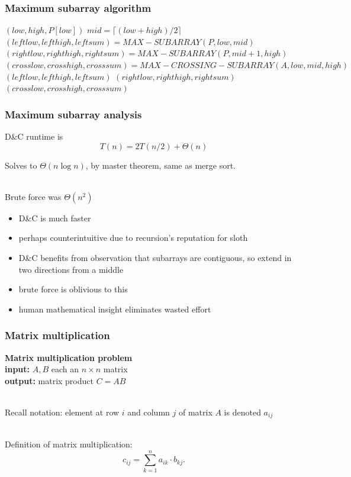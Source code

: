 \documentclass{beamer}
\newcommand{\stanza}{ \\~\ }
\begin{document}
\begin{frame} \frametitle{Maximum subarray algorithm}
  {\tiny
  \begin{algorithmic}[1]
      \State \Return $(low, high, P[low])$
    \Else
      \State $mid = \lceil (low+high)/2 \rceil$
      \State $(leftlow, lefthigh, leftsum) = MAX-SUBARRAY(P, low, mid)$
      \State $(rightlow, righthigh, rightsum) = MAX-SUBARRAY(P, mid+1, high)$
      \State $(crosslow, crosshigh, crosssum) = MAX-CROSSING-SUBARRAY(A, low, mid, high)$
        \State \Return $(leftlow, lefthigh, leftsum)$ 
        \State \Return $(rightlow, righthigh, rightsum)$ 
      \Else
        \State \Return $(crosslow, crosshigh, crosssum)$ 
      \EndIf
    \EndIf
    \EndFunction
  \end{algorithmic}
  }
\end{frame}

\begin{frame} \frametitle{Maximum subarray analysis}
  D\&C runtime is \[ T(n) = 2 T(n/2) + \Theta(n) \]

  Solves to $\Theta(n \log n)$, by master theorem, same as merge sort. \stanza

  Brute force was $\Theta(n^2)$
  \begin{itemize}
    \item D\&C is much faster
    \item perhaps counterintuitive due to recursion's reputation for sloth
    \item D\&C benefits from observation that subarrays are contiguous, so
      extend in two directions from a middle
    \item brute force is oblivious to this
    \item human mathematical insight eliminates wasted effort
  \end{itemize}
\end{frame}

\begin{frame} \frametitle{Matrix multiplication}
  \textbf{Matrix multiplication problem} \\
  \textbf{input: } $A, B$ each an $n \times n$ matrix \\
  \textbf{output: } matrix product $C = AB$ \stanza

  Recall notation: element at row $i$ and column $j$ of matrix $A$ is
  denoted $a_{ij}$ \stanza

  Definition of matrix multiplication:
  \[ c_{ij} = \sum_{k=1}^n a_{ik} \cdot b_{kj} . \]
\end{frame}
\end{document}
